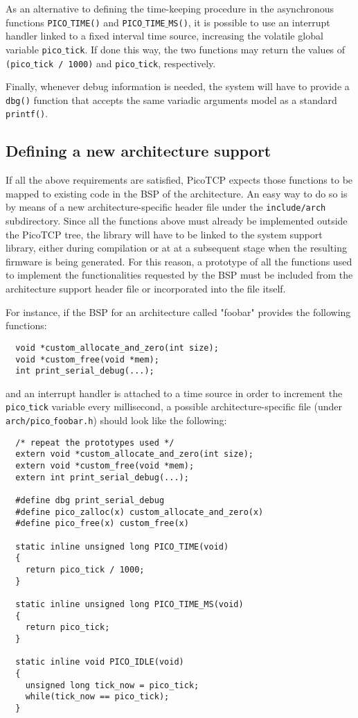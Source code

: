 As an alternative to defining the time-keeping procedure in the asynchronous
functions \texttt{PICO$\_$TIME()} and \texttt{PICO$\_$TIME$\_$MS()}, it is possible
to use an interrupt handler linked to a fixed interval time source, increasing the
volatile global variable \texttt{pico$\_$tick}. If done this way, the two
functions may return the values of \texttt{(pico$\_$tick / 1000)} and
\texttt{pico$\_$tick}, respectively.

Finally, whenever debug information is needed, the system will have to provide a
\texttt{dbg()} function that accepts the same variadic arguments model as a standard \texttt{printf()}.


\subsection{Defining a new architecture support}
If all the above requirements are satisfied, PicoTCP expects those
functions to be mapped to existing code in the BSP of the architecture.
An easy way to do so is by means of a new architecture-specific header
file under the \texttt{include/arch} subdirectory.
Since all the functions above must already be implemented outside the
PicoTCP tree, the library will have to be linked to the system support
library, either during compilation or at at a subsequent stage when the resulting
firmware is being generated. For this reason, a prototype of all the
functions used to implement the functionalities requested by the BSP
must be included from the architecture support header file or incorporated
into the file itself.

For instance, if the BSP for an architecture called "foobar" provides the 
following functions:
\begin{verbatim}
  void *custom_allocate_and_zero(int size);
  void *custom_free(void *mem);
  int print_serial_debug(...);
\end{verbatim}
and an interrupt handler is attached to a time source in order to increment
the \texttt{pico$\_$tick} variable every millisecond, a possible architecture-specific 
file (under \texttt{arch/pico$\_$foobar.h}) should look like the following:

\begin{verbatim}
  /* repeat the prototypes used */
  extern void *custom_allocate_and_zero(int size);
  extern void *custom_free(void *mem);
  extern int print_serial_debug(...);

  #define dbg print_serial_debug
  #define pico_zalloc(x) custom_allocate_and_zero(x)
  #define pico_free(x) custom_free(x)

  static inline unsigned long PICO_TIME(void)
  {
    return pico_tick / 1000;
  }

  static inline unsigned long PICO_TIME_MS(void)
  {
    return pico_tick;
  }

  static inline void PICO_IDLE(void)
  {
    unsigned long tick_now = pico_tick;
    while(tick_now == pico_tick);
  }

\end{verbatim}

